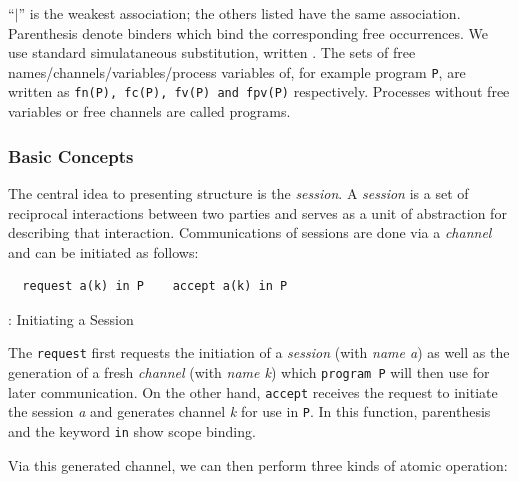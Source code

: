 \documentclass[11pt]{scrartcl}
\begin{document}
``$|$'' is the weakest association; the others listed have the same association. 
Parenthesis denote binders which bind the corresponding free occurrences. We use standard simulataneous substitution, written $ $. The sets of free names/channels/variables/process variables of, for example program \texttt{P}, are written as \texttt{fn(P), fc(P), fv(P) and fpv(P)} respectively. Processes without free variables or free channels are called programs.

\subsubsection{Basic Concepts}

The central idea to presenting structure is the \emph{session}. A \emph{session} 
is a set of reciprocal interactions between two parties and serves as a unit of 
abstraction for describing that interaction. Communications of sessions are done 
via a \emph{channel} and can be initiated as follows:

\begin{multicols}{2}

	\begin{minipage}{0.5\textwidth}
		\begin{verbatim}
  request a(k) in P    accept a(k) in P 
		\end{verbatim}
	\end{minipage}
	
	\begin{minipage}{0.5\textwidth}

\hspace*{15pt}: Initiating a Session
	\end{minipage}

\end{multicols}

The \texttt{request} first requests the initiation of a \emph{session} (with 
\emph{name a}) as well as the generation of a fresh \emph{channel} (with 
\emph{name k}) which \texttt{program P} will then use for later communication. 
On the other hand, \texttt{accept} receives the request to initiate the session 
\emph{a} and generates channel \emph{k} for use in \texttt{P}. In this function, 
parenthesis and the keyword \texttt{in} show scope binding.

Via this generated channel, we can then perform three kinds of atomic operation:
\end{document}
